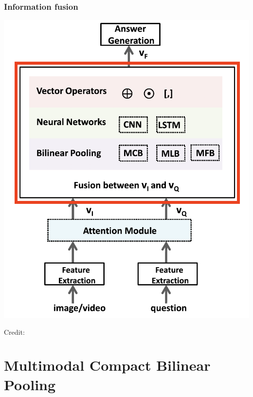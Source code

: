 \documentclass{beamer}
\begin{document}
\begin{frame}
\frametitle{Information fusion}
\begin{center}
\includegraphics[scale=0.35]{./images/InformationFusion}
\end{center}
\begin{center}
\hspace*{12pt}\hbox{\scriptsize Credit:}
\end{center}
\end{frame}


\section{Multimodal Compact Bilinear Pooling} 
\end{document}
